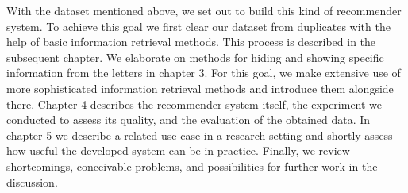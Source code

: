 With the dataset mentioned above, we set out to build this kind of recommender system. To achieve this goal we first clear our dataset from duplicates with the help of basic information retrieval methods. This process is described in the subsequent chapter. We elaborate on methods for hiding and showing specific information from the letters in chapter 3. For this goal, we make extensive use of more sophisticated information retrieval methods and introduce them alongside there. Chapter 4 describes the recommender system itself, the experiment we conducted to assess its quality, and the evaluation of the obtained data. In chapter 5 we describe a related use case in a research setting and shortly assess how useful the developed system can be in practice. Finally, we review shortcomings, conceivable problems, and possibilities for further work in the discussion.

